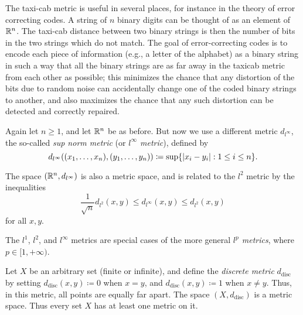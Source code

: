 \begin{rmk}\label{ii:1.1.8}
  The taxi-cab metric is useful in several places, for instance in the theory of error correcting codes.
  A string of \(n\) binary digits can be thought of as an element of \(\mathbb{R}^n\).
  The taxi-cab distance between two binary strings is then the number of bits in the two strings which do not match.
  The goal of error-correcting codes is to encode each piece of information (e.g., a letter of the alphabet) as a binary string in such a way that all the binary strings are as far away in the taxicab metric from each other as possible;
  this minimizes the chance that any distortion of the bits due to random noise can accidentally change one of the coded binary strings to another, and also maximizes the chance that any such distortion can be detected and correctly repaired.
\end{rmk}

\begin{eg}\label{ii:1.1.9}
  Again let \(n \geq 1\), and let \(\mathbb{R}^n\) be as before.
  But now we use a different metric \(d_{l^\infty}\), the so-called \emph{sup norm metric} (or \emph{\(l^\infty\) metric}), defined by
  \[
    d_{l^\infty} ((x_1, \dots, x_n), (y_1, \dots, y_n)) \coloneqq \sup\set{\abs{x_i - y_i} : 1 \leq i \leq n}.
  \]
\end{eg}

\begin{note}
  The space \((\mathbb{R}^n, d_{l^\infty})\) is also a metric space, and is related to the \(l^2\) metric by the inequalities
  \[
    \dfrac{1}{\sqrt{n}} d_{l^2}(x, y) \leq d_{l^\infty}(x, y) \leq d_{l^2}(x, y)
  \]
  for all \(x, y\).
\end{note}

\begin{rmk}\label{ii:1.1.10}
  The \(l^1\), \(l^2\), and \(l^\infty\) metrics are special cases of the more general \emph{\(l^p\) metrics}, where \(p \in [1, +\infty)\).
\end{rmk}

\begin{eg}\label{ii:1.1.11}
  Let \(X\) be an arbitrary set (finite or infinite), and define the \emph{discrete metric} \(d_{\text{disc}}\) by setting \(d_{\text{disc}}(x, y) \coloneqq 0\) when \(x = y\), and \(d_{\text{disc}}(x, y) \coloneqq 1\) when \(x \neq y\).
  Thus, in this metric, all points are equally far apart.
  The space \((X, d_{\text{disc}})\) is a metric space.
  Thus every set \(X\) has at least one metric on it.
\end{eg}

